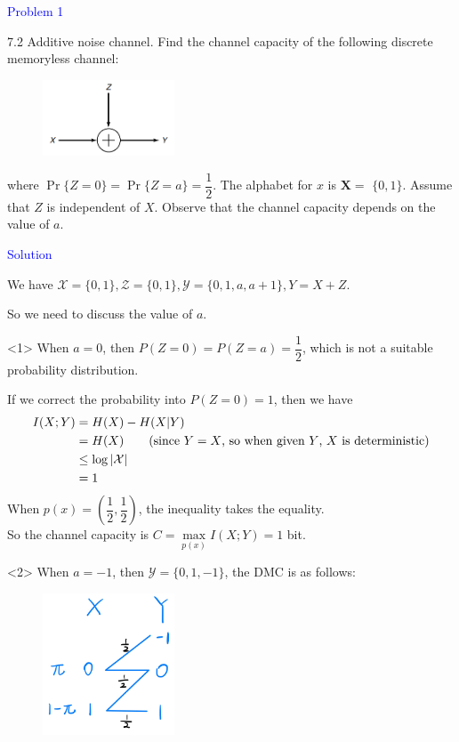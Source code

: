 \textcolor{blue}{Problem 1}

7.2 Additive noise channel. Find the channel capacity of the following discrete memoryless channel:
\begin{figure}[htbp]
    \centering
	\includegraphics[width=0.35\textwidth]{../figures/7.2.png}
\end{figure}

where $\operatorname{Pr}\{Z=0\}=\operatorname{Pr}\{Z=a\}=\dfrac{1}{2}$. The alphabet for $x$ is $\mathbf{X}=$ $\{0,1\}$. Assume that $Z$ is independent of $X$. Observe that the channel capacity depends on the value of $a$.

\textcolor{blue}{Solution}

We have $\mathcal{X}=\{0,1\}, \mathcal{Z}=\{0,1\}, \mathcal{Y}=\{0,1,a,a+1\}, Y=X+Z$.

So we need to discuss the value of $a$.

<1> When $a=0$, then $P(Z=0)=P(Z=a)=\dfrac{1}{2}$, which is not a suitable probability distribution.

If we correct the probability into $P(Z=0)=1$, then we have
\begin{align*}
I(X;Y) &= H(X)-H(X|Y) \\
&= H(X) \text{\qquad (since $Y=X$, so when given $Y$, $X$ is deterministic)} \\
&\leq \log \left|\mathcal{X}\right| \\
&= 1
\end{align*}
When $p(x)=\left(\dfrac{1}{2},\dfrac{1}{2}\right)$, the inequality takes the equality. \\
So the channel capacity is $C=\max\limits_{p(x)}I(X;Y)=1$ bit.

<2> When $a=-1$, then $\mathcal{Y}= \{0,1,-1\}$, the DMC is as follows:
\begin{figure}[htbp]
    \centering
	\includegraphics[width=0.35\textwidth]{../figures/7.2_-1.png}
\end{figure}

